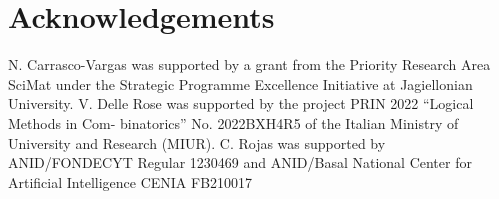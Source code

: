 \documentclass[10pt,A4]{amsart}
\theoremstyle{definition}
\theoremstyle{definition}
\begin{document}
\section*{Acknowledgements}
N. Carrasco-Vargas was supported by a grant from the Priority Research Area SciMat under the Strategic Programme Excellence Initiative at Jagiellonian University. V. Delle Rose was supported by the project PRIN 2022 “Logical Methods in Com-
binatorics” No. 2022BXH4R5 of the Italian Ministry of University and Research
(MIUR). C. Rojas was supported by ANID/FONDECYT Regular 1230469 and
ANID/Basal National Center for Artificial Intelligence CENIA FB210017


\end{document}
